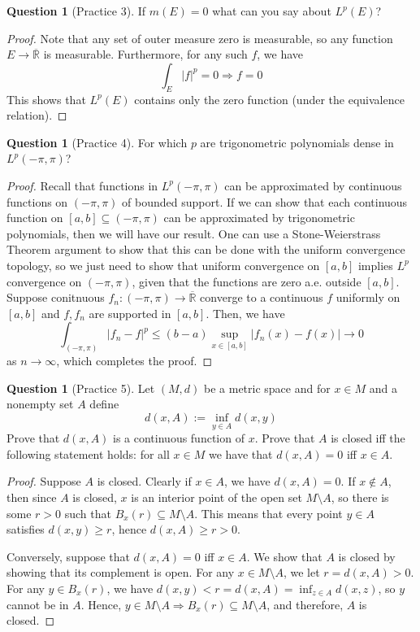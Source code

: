 \documentclass{article}
\renewcommand{\implies}{\Rightarrow}
\newcommand{\R}{\mathbb{R}}
\newcommand{\cl}[1]{\overline{#1}}
\theoremstyle{definition} %
\numberwithin{thm}{section} %
\theoremstyle{definition} %
\newtheorem{question}[thm]{Question}
\begin{document}
\begin{question}[Practice 3]
If $m(E) = 0$ what can you say about $L^p(E)$?
\end{question}
\begin{proof}
Note that any set of outer measure zero is measurable, so any function $E \to \cl{\R}$ is measurable. Furthermore, for any such $f$, we have 
\[ \int_E |f|^p = 0 \implies f = 0 \]
This shows that $L^p(E)$ contains only the zero function (under the equivalence relation).
\end{proof}

\begin{question}[Practice 4]
For which $p$ are trigonometric polynomials dense in $L^p(-\pi, \pi)$?
\end{question}
\begin{proof}
Recall that functions in $L^p(-\pi, \pi)$ can be approximated by continuous functions on $(-\pi, \pi)$ of bounded support. If we can show that each continuous function on $[a, b] \subseteq (-\pi, \pi)$ can be approximated by trigonometric polynomials, then we will have our result. One can use a Stone-Weierstrass Theorem argument to show that this can be done with the uniform convergence topology, so we just need to show that uniform convergence on $[a, b]$ implies $L^p$ convergence on $(-\pi, \pi)$, given that the functions are zero a.e. outside $[a, b]$. Suppose conitnuous $f_n: (-\pi, \pi) \to \cl{\R}$ converge to a continuous $f$ uniformly on $[a, b]$ and $f, f_n$ are supported in $[a, b]$. Then, we have 
\[ \int_{(-\pi, \pi)} |f_n - f|^p \leq (b - a)\sup_{x \in [a, b]}|f_n(x) - f(x)| \to 0 \]
as $n \to \infty$, which completes the proof.
\end{proof}

\begin{question}[Practice 5]
Let $(M,d)$ be a metric space and for $x \in M$ and a nonempty set $A$ define
\[
d(x, A) := \inf_{y \in A} d(x,y)
\]
Prove that $d(x, A)$ is a continuous function of $x$. Prove that $A$ is closed iff the following statement holds: for all $x \in M$ we have that $d(x, A) = 0$ iff $x \in A$.
\end{question}
\begin{proof}
Suppose $A$ is closed. Clearly if $x \in A$, we have $d(x, A) = 0$. If $x \notin A$, then since $A$ is closed, $x$ is an interior point of the open set $M \setminus A$, so there is some $r > 0$ such that $B_x(r) \subseteq M \setminus A$. This means that every point $y \in A$ satisfies $d(x, y) \geq r$, hence $d(x, A) \geq r > 0$.

Conversely, suppose that $d(x, A) = 0$ iff $x \in A$. We show that $A$ is closed by showing that its complement is open. For any $x \in M \setminus A$, we let $r = d(x, A) > 0$. For any $y \in B_x(r)$, we have $d(x, y) < r = d(x, A) = \inf_{z \in A} d(x, z)$, so $y$ cannot be in $A$. Hence, $y \in M \setminus A \implies B_x(r) \subseteq M \setminus A$, and therefore, $A$ is closed.
\end{proof}
\end{document}
